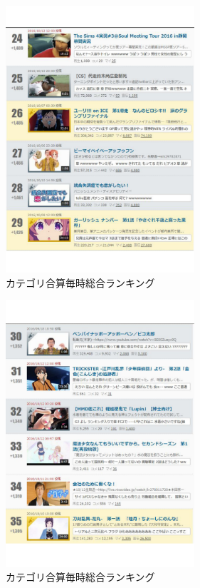\begin{figure}[htb]
\centering
\includegraphics[width=7cm]{r05.pdf}
\caption{カテゴリ合算毎時総合ランキング}\label{aaf}
\end{figure}

\begin{figure}[htb]
\centering
\includegraphics[width=7cm]{r06.pdf}
\caption{カテゴリ合算毎時総合ランキング}\label{aag}
\end{figure}

